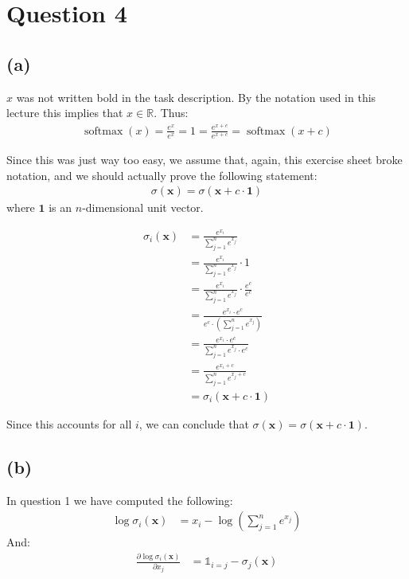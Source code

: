 \section*{Question 4}
\subsection*{(a)}
$x$ was not written bold in the task description. By the notation used in this lecture this implies that $x \in \mathbb{R}$. Thus:
\begin{align*}
\operatorname{softmax}(x) = \frac{e^x}{e^x} = 1 = \frac{e^{x+c}}{e^{x+c}} = \operatorname{softmax}(x+c)
\end{align*}

Since this was just way too easy, we assume that, again, this exercise sheet broke notation, and we should actually prove the following statement:
\begin{align*}
\sigma(\boldsymbol{x}) = \sigma(\boldsymbol{x} + c \cdot \boldsymbol{1})
\end{align*}
where $\boldsymbol{1}$ is an $n$-dimensional unit vector.

\begin{align*}
\sigma_i(\boldsymbol{x}) &= \frac{e^{x_i}}{\sum_{j=1}^n e^{x_j}} \\
&= \frac{e^{x_i}}{\sum_{j=1}^n e^{x_j}} \cdot 1\\
&= \frac{e^{x_i}}{\sum_{j=1}^n e^{x_j}} \cdot \frac{e^c}{e^c} \\
&= \frac{e^{x_i} \cdot e^c}{e^c \cdot (\sum_{j=1}^n e^{x_j})} \\
&= \frac{e^{x_i} \cdot e^c}{\sum_{j=1}^n e^{x_j} \cdot e^c} \\
&= \frac{e^{x_i + c}}{\sum_{j=1}^n e^{x_j + c}} \\
&= \sigma_i(\boldsymbol{x} + c \cdot \boldsymbol{1})
\end{align*}

Since this accounts for all $i$, we can conclude that $\sigma(\boldsymbol{x}) = \sigma(\boldsymbol{x} + c \cdot \boldsymbol{1})$.

\subsection*{(b)}
In question 1 we have computed the following:
\begin{align*}
\log \sigma_i(\boldsymbol{x}) &= x_i - \log \left( \sum_{j=1}^n e^{x_j} \right)
\end{align*}
And:
\begin{align*}
\frac{\partial \log \sigma_i(\boldsymbol{x})}{\partial x_j} &= \mathds{1}_{i=j} - \sigma_j(\boldsymbol{x})
\end{align*}

